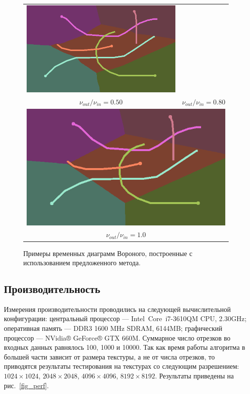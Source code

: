 \documentclass[12pt]{article}
\begin{document}
\begin{figure}
\begin{center}
\begin{tabular}{c c}
\includegraphics[scale=0.2]{sample080.png} \\
$\nu_{out} / \nu_{in} = 0.50$ & $\nu_{out} / \nu_{in} = 0.80$ \\
\multicolumn{2}{c}{\includegraphics[scale=0.2]{sample100.png}} \\
\multicolumn{2}{c}{$\nu_{out} / \nu_{in} = 1.0$}
\end{tabular}
\end{center}
\caption{Примеры временных диаграмм Вороного, построенные с использованием предложенного метода.}
\label{fig_samples}
\end{figure}

\subsection{Производительность}
Измерения производительности проводились на следующей вычислительной 
конфигурации: центральный процессор --- Intel\textregistered \,
Core\texttrademark \, i7-3610QM CPU, 2.30GHz;
оперативная память --- DDR3 1600 MHz SDRAM, 6144MB; графический процессор 
--- NVidia® GeForce® GTX 660M. Суммарное число отрезков во входных данных
равнялось 100, 1000 и 10000. Так как время работы алгоритма в большей части
зависит от размера текстуры, а не от числа отрезков, то приводятся
результаты тестирования на текстурах со следующим разрешением: 
$1024 \times 1024$, $2048 \times 2048$, $4096 \times 4096$, $8192 \times 8192$. 
Результаты приведены на рис.~\ref{fig_perf}.
\end{document}
